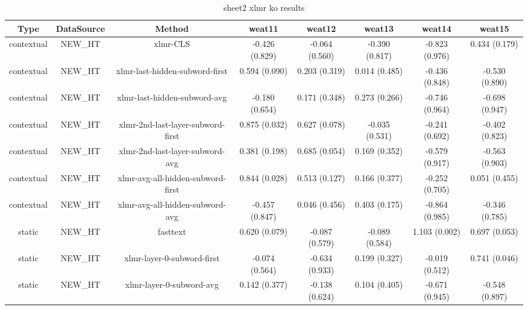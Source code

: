\begin{sidewaystable}[htb]
    \centering
    \caption{sheet2 xlmr ko results}
    \label{appendix_tab:sheet2_xlmr_ko_results}
    \small
    \begin{tabular}{@{}cccccccc@{}}
        \toprule
        Type & DataSource & Method & weat11 & weat12 & weat13 & weat14 & weat15 \\
        \midrule
        contextual & NEW\_HT & xlmr-CLS & -0.426 (0.829) & -0.064 (0.560) & -0.390 (0.817) & -0.823 (0.976) & 0.434 (0.179) \\
        contextual & NEW\_HT & xlmr-last-hidden-subword-first & 0.594 (0.090) & 0.203 (0.319) & 0.014 (0.485) & -0.436 (0.848) & -0.530 (0.890) \\
        contextual & NEW\_HT & xlmr-last-hidden-subword-avg & -0.180 (0.654) & 0.171 (0.348) & 0.273 (0.266) & -0.746 (0.964) & -0.698 (0.947) \\
        contextual & NEW\_HT & xlmr-2nd-last-layer-subword-first & 0.875 (0.032) & 0.627 (0.078) & -0.035 (0.531) & -0.241 (0.692) & -0.402 (0.823) \\
        contextual & NEW\_HT & xlmr-2nd-last-layer-subword-avg & 0.381 (0.198) & 0.685 (0.054) & 0.169 (0.352) & -0.579 (0.917) & -0.563 (0.903) \\
        contextual & NEW\_HT & xlmr-avg-all-hidden-subword-first & 0.844 (0.028) & 0.513 (0.127) & 0.166 (0.377) & -0.252 (0.705) & 0.051 (0.455) \\
        contextual & NEW\_HT & xlmr-avg-all-hidden-subword-avg & -0.457 (0.847) & 0.046 (0.456) & 0.403 (0.175) & -0.864 (0.985) & -0.346 (0.785) \\
        static & NEW\_HT & fasttext & 0.620 (0.079) & -0.087 (0.579) & -0.089 (0.584) & 1.103 (0.002) & 0.697 (0.053) \\
        static & NEW\_HT & xlmr-layer-0-subword-first & -0.074 (0.564) & -0.634 (0.933) & 0.199 (0.327) & -0.019 (0.512) & 0.741 (0.046) \\
        static & NEW\_HT & xlmr-layer-0-subword-avg & 0.142 (0.377) & -0.138 (0.624) & 0.104 (0.405) & -0.671 (0.945) & -0.548 (0.897) \\
        \bottomrule
    \end{tabular}
\end{sidewaystable}